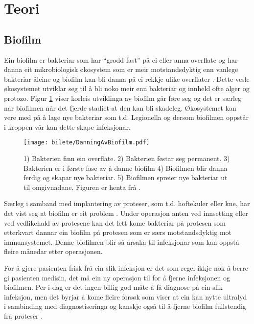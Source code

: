 \section{Teori}
\subsection{Biofilm}
Ein biofilm er bakteriar som har ``grodd fast'' på ei eller anna overflate og har danna eit mikrobiologisk økosystem som er meir motstandsdyktig enn vanlege bakteriar åleine og biofilm kan bli danna på ei rekkje ulike overflater \cite{biofilm}\cite{biofilm2}. Dette vesle økosystemet utviklar seg til å bli noko meir enn bakteriar og innheld ofte alger og protozo. Figur \ref{fig:biofilm} viser korleis utviklinga av biofilm går føre seg og det er særleg når biofilmen når det fjerde stadiet at den kan bli skadeleg. Økosystemet kan vere med på å lage nye bakteriar som t.d. Legionella \cite{biofilm} og dersom biofilmen oppstår i kroppen vår kan dette skape infeksjonar.

\begin{figure}[htbp]
	\centering
	\texttt{[image: bilete/DanningAvBiofilm.pdf]}
  	\caption[Dei fem fasene i biofilmdanning]{1) Bakterien finn ein overflate. 2) Bakterien festar seg permanent. 3) Bakterien er i første fase av å danne biofilm 4) Biofilmen blir danna ferdig og skapar nye bakteriar. 5) Biofilmen spreier nye bakteriar ut til omgivnadane. Figuren er henta frå \cite{biofilmfigur}.}
  	\label{fig:biofilm}
\end{figure}

Særleg i samband med implantering av proteser, som t.d. hoftekuler eller kne, har det vist seg at biofilm er eit problem \cite{ultraprotese}. Under operasjon anten ved innsetting eller ved vedlikehald av protesene kan det lett kome bakteriar på protesen som etterkvart dannar ein biofilm på protesen som er særs motstandsdyktig mot immunsystemet. Denne biofilmen blir så årsaka til infeksjonar som kan oppstå fleire månedar etter operasjonen. 

For å gjere pasienten frisk frå ein slik infeksjon er det som regel ikkje nok å berre gi pasienten medisin, det må ein ny operasjon til for å fjerne infeksjonen og biofilmen\cite{infection}. Per i dag er det ingen billig god måte å få diagnose på ein slik infeksjon, men det byrjar å kome fleire forsøk som viser at ein kan nytte ultralyd i sambinding med diagnostiseringa og kanskje også til å fjerne biofilm fullstendig frå proteser \cite{ultraprotese}.

